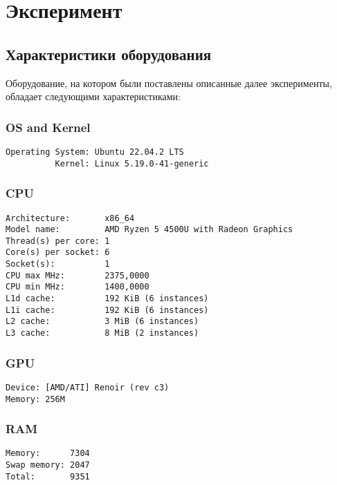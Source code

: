 
\section{Эксперимент}

\subsection{Характеристики оборудования}
Оборудование, на котором были поставлены описанные далее эксперименты, обладает следующими характеристиками:
\subsubsection*{OS and Kernel}

\begin{verbatim}
Operating System: Ubuntu 22.04.2 LTS
          Kernel: Linux 5.19.0-41-generic
\end{verbatim}

\subsubsection*{CPU}
\begin{verbatim}
Architecture:       x86_64
Model name:         AMD Ryzen 5 4500U with Radeon Graphics
Thread(s) per core: 1
Core(s) per socket: 6
Socket(s):          1
CPU max MHz:        2375,0000
CPU min MHz:        1400,0000
L1d cache:          192 KiB (6 instances)
L1i cache:          192 KiB (6 instances)
L2 cache:           3 MiB (6 instances)
L3 cache:           8 MiB (2 instances)
\end{verbatim}

\subsubsection*{GPU}
\begin{verbatim}
Device: [AMD/ATI] Renoir (rev c3)
Memory: 256M
\end{verbatim}

\subsubsection*{RAM}
\begin{verbatim}
Memory:      7304
Swap memory: 2047
Total:       9351 
\end{verbatim}

